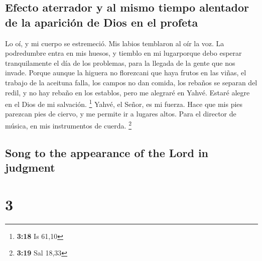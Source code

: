 \begin{paracol}{2}
\hypertarget{efecto-aterrador-y-al-mismo-tiempo-alentador-de-la-apariciuxf3n-de-dios-en-el-profeta}{%
\subsection{Efecto aterrador y al mismo tiempo alentador de la aparición
de Dios en el
profeta}\label{efecto-aterrador-y-al-mismo-tiempo-alentador-de-la-apariciuxf3n-de-dios-en-el-profeta}}

 Lo oí, y mi cuerpo se estremeció. Mis labios temblaron
al oír la voz. La podredumbre entra en mis huesos, y tiemblo en mi
lugarporque debo esperar tranquilamente el día de los problemas, para la
llegada de la gente que nos invade.  Porque aunque la
higuera no florezcani que haya frutos en las viñas, el trabajo de la
aceituna falla, los campos no dan comida, los rebaños se separan del
redil, y no hay rebaño en los establos,  pero me alegraré
en Yahvé. Estaré alegre en el Dios de mi salvación. \footnote{\textbf{3:18}
  Is 61,10}  Yahvé, el Señor, es mi fuerza. Hace que mis
pies parezcan pies de ciervo, y me permite ir a lugares altos. Para el
director de música, en mis instrumentos de cuerda. \footnote{\textbf{3:19}
  Sal 18,33} \switchcolumn \begin{otherlanguage}{english}

\hypertarget{song-to-the-appearance-of-the-lord-in-judgment}{%
\subsection{Song to the appearance of the Lord in
judgment}\label{song-to-the-appearance-of-the-lord-in-judgment}}

\hypertarget{section-5}{%
\section{3}\label{section-5}}


\end{otherlanguage}
\end{paracol}
